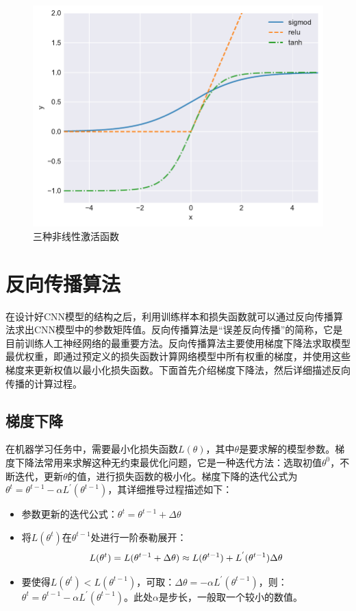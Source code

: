 \begin{figure}[htbp]
    \begin{center}
    \includegraphics[height=0.4\textwidth]{figures/relu.pdf}
    \end{center}
    \caption{三种非线性激活函数}\label{figure:figure6}
\end{figure}

\section{反向传播算法}
\label{chapter:ch2-2}
在设计好CNN模型的结构之后，利用训练样本和损失函数就可以通过反向传播算法求出CNN模型中的参数矩阵值。反向传播算法是“误差反向传播”的简称，它是目前训练人工神经网络的最重要方法。反向传播算法主要使用梯度下降法求取模型最优权重，即通过预定义的损失函数计算网络模型中所有权重的梯度，并使用这些梯度来更新权值以最小化损失函数。下面首先介绍梯度下降法，然后详细描述反向传播的计算过程。

\subsection{梯度下降}
在机器学习任务中，需要最小化损失函数$L(\theta)$，其中$\theta$是要求解的模型参数。梯度下降法常用来求解这种无约束最优化问题，它是一种迭代方法：选取初值$\theta^0$，不断迭代，更新$\theta$的值，进行损失函数的极小化。梯度下降的迭代公式为$\theta^t=\theta^{t-1}-\alpha L^{'}(\theta^{t-1})$，其详细推导过程描述如下：

\begin{itemize}
  \item 参数更新的迭代公式：$\theta^t=\theta^{t-1}+\Delta\theta$
  \item 将$L(\theta^t)$在$\theta^{t-1}$处进行一阶泰勒展开：
  $$
  L(\theta^t)=L(\theta^{t-1}+\Delta\theta) \\
  \approx L(\theta^{t-1}) + L^{'}(\theta^{t-1})\Delta\theta
  $$
  \item 要使得$L(\theta^t) < L(\theta^{t-1})$，可取：$\Delta\theta=-\alpha L^{'}(\theta^{t-1})$，则：$\theta^t=\theta^{t-1}-\alpha L^{'}(\theta^{t-1})$。此处$\alpha$是步长，一般取一个较小的数值。
\end{itemize}


